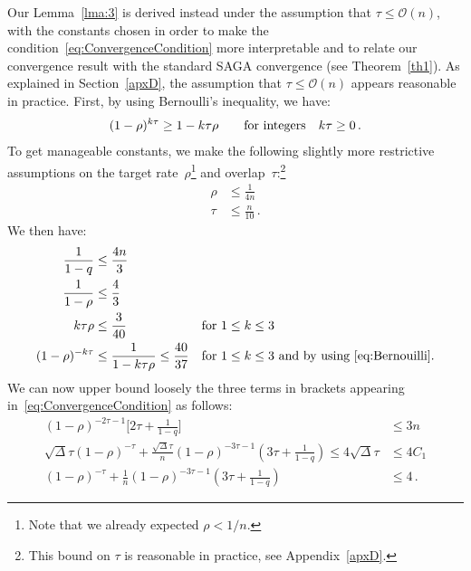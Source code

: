 \documentclass[twoside, 11pt]{article}
\newcommand{\overlap}{\tau}
\newcommand{\contraction}{\rho}
\newcommand{\sparsity}{\Delta}
\begin{document}
Our Lemma~\ref{lma:3} is derived instead under the assumption that $\overlap \leq \mathcal{O}(n)$, with the constants chosen in order to make the condition~\eqref{eq:ConvergenceCondition} more interpretable and to relate our convergence result with the standard SAGA convergence (see Theorem~\ref{th1}). As explained in Section~\ref{apxD}, the assumption that $\overlap \leq \mathcal{O}(n)$ appears reasonable in practice.
First, by using Bernoulli's inequality, we have:
\begin{equation} \label{eq:Bernouilli}
(1 - \contraction)^{k \overlap} \geq 1 - k\overlap \contraction \qquad \textnormal{for integers} \quad k\overlap \geq 0 \, .
\end{equation}
To get manageable constants, we make the following slightly more restrictive assumptions on the target rate~$\contraction$\footnote{Note that we already expected $\contraction < 1/n$.} and overlap~$\overlap$:\footnote{This bound on $\overlap$ is reasonable in practice, see Appendix~\ref{apxD}.}
\begin{align}
\contraction &\leq \frac{1}{4n} \label{eq:assumptionContraction}
\\
\overlap &\leq \frac{n}{10} \, . \label{eq:assumptionOverlap}
\end{align}
We then have:
\begin{align}
\frac{1}{1-q} &\leq \frac{4n}{3} & &
\\
\frac{1}{1-\contraction} &\leq \frac{4}{3} & &
\\
k\overlap\contraction &\leq \frac{3}{40} & &
\text{for $1 \leq k \leq 3$}
\\
(1 -\contraction)^{-k\overlap} &\leq \frac{1}{1-k\overlap \contraction} \leq \frac{40}{37} & &
\text{for $1 \leq k \leq 3$ and by using~\eqref{eq:Bernouilli}}.
\end{align}
We can now upper bound loosely the three terms in brackets appearing in~\eqref{eq:ConvergenceCondition} as follows:
\begin{align}
(1-\contraction)^{-2\overlap -1} \big[2\overlap + \frac{1}{1-q}\big] &\leq 3n \label{eq:Simp1}
\\
\sqrt{\sparsity}\overlap (1-\contraction)^{-\overlap} + \frac{\sqrt{\sparsity}\overlap}{n}(1 -\contraction)^{-3\overlap -1}(3\overlap + \frac{1}{1 -q})
\leq 4 \sqrt{\sparsity}\overlap &\leq 4C_1
\\
(1-\contraction)^{-\overlap} + \frac{1}{n}(1 -\contraction)^{-3\overlap -1}(3\overlap + \frac{1}{1 -q}) &\leq 4 \, .
\label{eq:Simp2}
\end{align}
\end{document}
